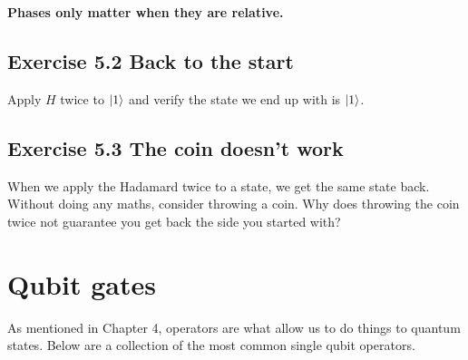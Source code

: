 \documentclass{book}
\begin{document}
\textbf{Phases only matter when they are relative.}



\subsection{Exercise 5.2 Back to the start}

Apply $H$ twice to $\ket{1}$ and verify the state we end up with is $\ket{1}$. 

\subsection{Exercise 5.3 The coin doesn't work}

When we apply the Hadamard twice to a state, we get the same state back. Without doing any maths, consider throwing a coin. Why does throwing the coin twice not guarantee you get back the side you started with? 

\vspace{5mm} %


 \section{Qubit gates }

As mentioned in Chapter 4, operators are what allow us to do things to quantum states. Below are a collection of the most common single qubit operators. 
\end{document}
